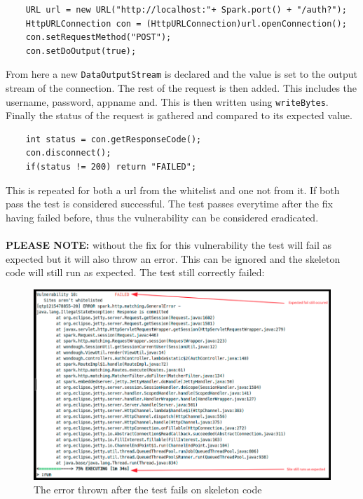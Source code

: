 \begin{verbatim}
    URL url = new URL("http://localhost:"+ Spark.port() + "/auth?");
    HttpURLConnection con = (HttpURLConnection)url.openConnection();
    con.setRequestMethod("POST");
    con.setDoOutput(true);
\end{verbatim}
From here a new \verb|DataOutputStream| is declared and the value is set to the output stream of the connection. The rest of the request is then added. This includes the username, password,
appname and. This is then written using \verb|writeBytes|. Finally the status of the request is gathered and compared to its expected value.
\begin{verbatim}
    int status = con.getResponseCode();
    con.disconnect();
    if(status != 200) return "FAILED";
\end{verbatim}
This is repeated for both a url from the whitelist and one not from it. If both pass the test is considered successful. The test passes everytime after the fix having failed before, thus
the vulnerability can be considered eradicated.\\ \\
\textbf{PLEASE NOTE:} without the fix for this vulnerability the test will fail as expected but it will also throw an error. This can be ignored and the skeleton code will still
run as expected. The test still correctly failed:
\begin{figure}[h]
    \centering
    \includegraphics[width=1\textwidth]{figs/fail.png}
    \caption{The error thrown after the test fails on skeleton code}
    \label{10}
\end{figure}\\


